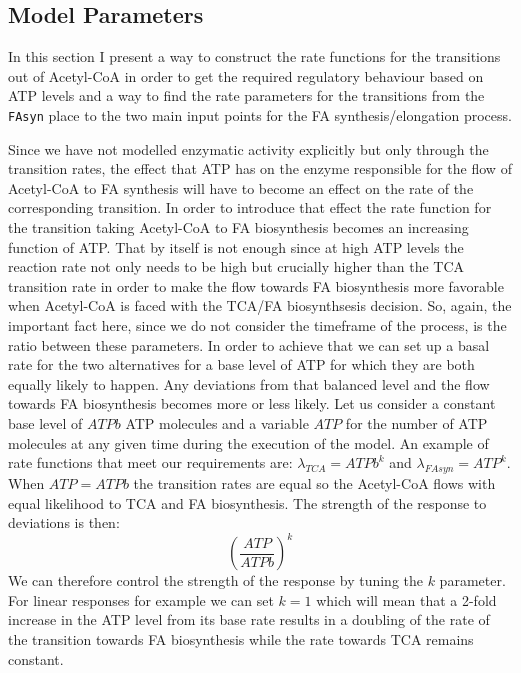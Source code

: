 \subsection{Model Parameters}
\label{sec:mod_param_ext}
In this section I present a way to construct the
rate functions for the transitions out of Acetyl-CoA in order to get
the required regulatory behaviour based on ATP levels and a way to
find the rate parameters for the transitions from the \texttt{FAsyn} place
to the two main input points for the FA synthesis/elongation process.

Since we have not modelled enzymatic
activity explicitly but only through the transition rates, the effect that ATP has on the enzyme responsible
for the flow of Acetyl-CoA to FA synthesis will have to become an effect
on the rate of the corresponding transition. In order to introduce
that effect the rate function for the transition taking Acetyl-CoA to FA biosynthesis
becomes an increasing function of ATP. That by itself
is not enough since at high ATP levels the reaction rate not only
needs to be high but crucially higher than the TCA transition rate in order to
make the flow towards FA biosynthesis more favorable when Acetyl-CoA
is faced with the TCA/FA biosynthsesis decision. So, again, the
important fact here, since we do not consider the timeframe of the
process, is the ratio between these parameters. In order to achieve
that we can set up a basal rate for the two alternatives for a
base level of ATP for which they are both equally likely to
happen. Any deviations from that balanced level and the flow towards
FA biosynthesis becomes more or less likely. Let us consider a
constant base level of $ATPb$ ATP molecules and a variable $ATP$ for the number
of ATP molecules at any given time during the execution of the
model. An example of rate functions that meet our requirements are:
$\lambda_{TCA} = ATPb^{k}$ and $\lambda_{FAsyn} =
ATP^{k}$. When $ATP=ATPb$ the transition rates are equal so the
Acetyl-CoA flows with equal likelihood to TCA and FA
biosynthesis. The strength of the response to deviations is then:
\begin{equation*}
\left ( \frac{ATP}{ATPb}\right)^{k}
\end{equation*}
We can therefore control the strength of the response by tuning the $k$
parameter. For linear responses for example we can set $k=1$ which
will mean that a 2-fold increase in the ATP level from its base rate
results in a doubling of the
rate of the transition towards FA biosynthesis while the rate towards
TCA remains constant.

